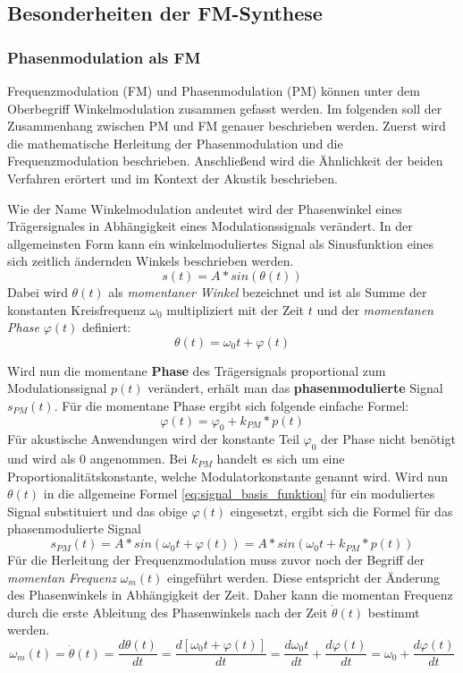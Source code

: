 \subsection{Besonderheiten der FM-Synthese}

\subsubsection{Phasenmodulation als FM}
Frequenzmodulation (FM) und Phasenmodulation (PM) können unter dem Oberbegriff Winkelmodulation zusammen gefasst werden. Im folgenden soll der Zusammenhang zwischen PM und FM genauer beschrieben werden. Zuerst wird die mathematische Herleitung der Phasenmodulation und die Frequenzmodulation beschrieben. Anschließend wird die Ähnlichkeit der beiden Verfahren erörtert und im Kontext der Akustik beschrieben.

Wie der Name Winkelmodulation andeutet wird der Phasenwinkel eines Trägersignales in Abhängigkeit eines Modulationssignals verändert. In der allgemeinsten Form kann ein winkelmoduliertes Signal als Sinusfunktion eines sich zeitlich ändernden Winkels beschrieben werden.
\begin{equation}
s(t)=A*sin(\theta(t))
\label{eq:signal_basis_funktion}
\end{equation}
Dabei wird \(\theta(t)\) als \textit{momentaner Winkel} bezeichnet und ist als Summe der konstanten Kreisfrequenz $\omega_0$ multipliziert mit der Zeit $t$ und der \textit{momentanen Phase} $\varphi(t)$ definiert:
\begin{equation*}
\theta(t)=\omega_0t + \varphi(t)
\end{equation*}

Wird nun die momentane \textbf{Phase} des Trägersignals proportional zum Modulationssignal \(p(t)\) verändert, erhält man das \textbf{phasenmodulierte} Signal \(s_{PM}(t)\).
Für die momentane Phase ergibt sich folgende einfache Formel:
\[
\varphi(t)=\varphi_0+k_{PM}*p(t)
\]
Für akustische Anwendungen wird der konstante Teil \(\varphi_0\) der Phase nicht benötigt und wird als 0 angenommen. Bei \(k_{PM}\) handelt es sich um eine Proportionalitätskonstante, welche Modulatorkonstante genannt wird. Wird nun \(\theta(t)\) in die allgemeine Formel \ref{eq:signal_basis_funktion} für ein moduliertes Signal substituiert und das obige \(\varphi(t)\) eingesetzt, ergibt sich die Formel für das phasenmodulierte Signal
\begin{equation}
s_{PM}(t)=A*sin(\omega_0t + \varphi(t))=A*sin(\omega_0t+k_{PM}*p(t))
\label{eq:s_pm}
\end{equation}
Für die Herleitung der Frequenzmodulation muss zuvor noch der Begriff der \textit{momentan Frequenz} \(\omega_m(t)\) eingeführt werden.
Diese entspricht der Änderung des Phasenwinkels in Abhängigkeit der Zeit. Daher kann die momentan Frequenz durch die erste Ableitung des Phasenwinkels nach der Zeit $\dot \theta(t)$ bestimmt werden.
\begin{equation}
\omega_m(t)=\dot \theta(t)=\frac{d\theta(t)}{dt}=\frac{d[\omega_0t+\varphi(t)]}{dt}=\frac{d\omega_0t}{dt}+\frac{d\varphi(t)}{dt}=\omega_0+\frac{d\varphi(t)}{dt}
\label{eq:omega_m_herleitung}
\end{equation}



